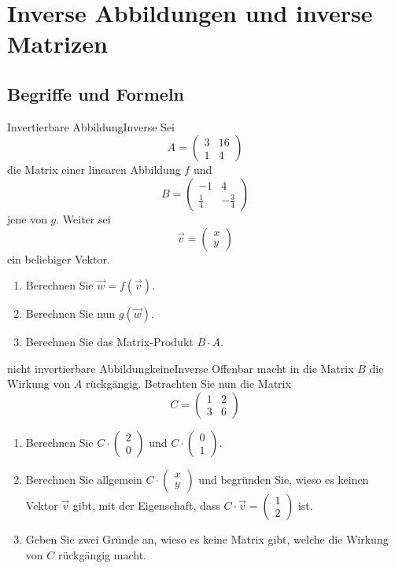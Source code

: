 \section{Inverse Abbildungen und inverse Matrizen}
\subsection{Begriffe und Formeln}
\begin{LA}
{Invertierbare Abbildung}{Inverse}
Sei 
\[
A = \begin{pmatrix} 3 & 16 \\ 1 & 4 \end{pmatrix}
\]
die Matrix einer linearen Abbildung \( f \) und 
\[
B = \begin{pmatrix} -1 & 4 \\ \frac{1}{4} & -\frac{3}{4} \end{pmatrix}
\]
jene von \( g \). Weiter sei 
\[
\vec{v} = \begin{pmatrix} x \\ y \end{pmatrix}
\]
ein beliebiger Vektor.

\begin{enumerate}
    \item Berechnen Sie \( \vec{w} = f(\vec{v}) \).
    \item Berechnen Sie nun \( g(\vec{w}) \).
    \item Berechnen Sie das Matrix-Produkt \( B \cdot A \).
\end{enumerate}
\end{LA}
\clearpage
\begin{LA}{nicht invertierbare Abbildung}{keineInverse}
Offenbar macht in  die Matrix $B$ die Wirkung von $A$ rückgängig. Betrachten Sie nun die Matrix
$$C = \begin{pmatrix}
    1&2 \\3&6
\end{pmatrix} $$

\begin{enumerate}
    \item Berechnen Sie $C\cdot\begin{pmatrix}
        2\\0
    \end{pmatrix}$ und $C\cdot\begin{pmatrix}
        0\\1
    \end{pmatrix}$.
    \item Berechnen Sie allgemein $C\cdot\begin{pmatrix}
        x\\y
    \end{pmatrix}$ und begründen Sie, wieso es keinen Vektor $\vec{v}$ gibt, mit der Eigenschaft, dass $C\cdot\vec{v} = \begin{pmatrix}
        1 \\2
    \end{pmatrix}$ ist.
    \item Geben Sie zwei Gründe an, wieso es keine Matrix gibt, welche die Wirkung von $C$ rückgängig macht.
\end{enumerate}
\end{LA}

